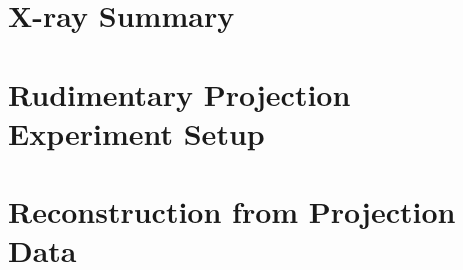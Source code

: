 \section{X-ray Summary}

\section{Rudimentary Projection Experiment Setup}

\section{Reconstruction from Projection Data}